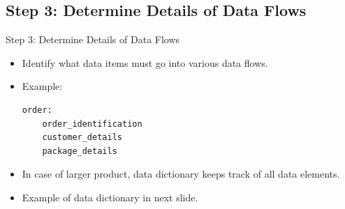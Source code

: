 \documentclass{beamer}
\begin{document}
	\subsection{Step 3: Determine Details of Data Flows}
	\begin{frame}[fragile]{Step 3: Determine Details of Data Flows}
		\begin{itemize}
			\item Identify what data items must go into various data flows.
			\item Example:
\begin{verbatim}
order:
    order_identification
    customer_details
    package_details
\end{verbatim}
			\item In case of larger product, data dictionary keeps track of all data elements.
			\item Example of data dictionary in next slide.
		\end{itemize}
	\end{frame}
\end{document}
